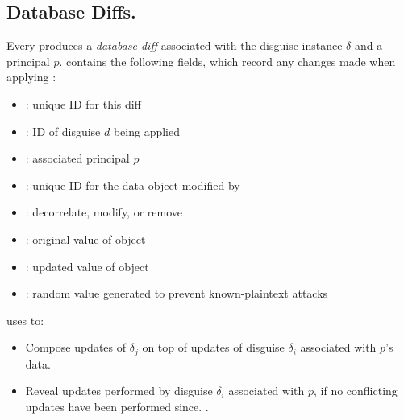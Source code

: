 \subsection{Database Diffs.}
Every  produces a \emph{database diff}  associated with the disguise instance $\delta$ and a
principal $p$. 
%
 contains the following fields, which record any changes made when applying :
%
\begin{itemize}
\item {}: unique ID for this diff
\item {}: ID of disguise $d$ being applied
\item {}: associated principal $p$
\item {}: unique ID for the data object modified by 
\item {}: decorrelate, modify, or remove
\item {}: original value of object 
\item {}: updated value of object 
\item {}: random value generated to prevent known-plaintext attacks
\end{itemize}

\noindent\sys uses  to:
\begin{itemize}
    \item Compose updates of $\delta_j$ on top of updates of disguise $\delta_i$ associated with
        $p$'s data.
    \item Reveal updates performed by disguise $\delta_i$ associated with $p$, if no conflicting updates have been
        performed since.
.
\end{itemize}

